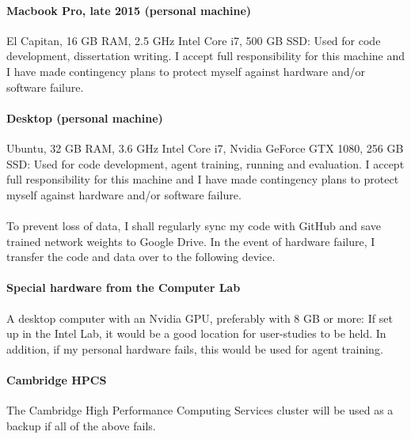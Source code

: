 \documentclass[a4paper]{article}
\begin{document}
\paragraph{Macbook Pro, late 2015 (personal machine)} El Capitan, 16 GB RAM, 2.5 GHz Intel Core i7, 500 GB SSD: Used for code development, dissertation writing. I accept full responsibility for this machine and I have made contingency plans to protect myself against hardware and/or software failure.

\paragraph{Desktop (personal machine)} Ubuntu, 32 GB RAM, 3.6 GHz Intel Core i7, Nvidia GeForce GTX 1080, 256 GB SSD: Used for code development, agent training, running and evaluation. I accept full responsibility for this machine and I have made contingency plans to protect myself against hardware and/or software failure.

\paragraph{}To prevent loss of data, I shall regularly sync my code with GitHub and save trained network weights to Google Drive. In the event of hardware failure, I transfer the code and data over to the following device.

\paragraph{Special hardware from the Computer Lab} A desktop computer with an Nvidia GPU, preferably with 8 GB or more: If set up in the Intel Lab, it would be a good location for user-studies to be held. In addition, if my personal hardware fails, this would be used for agent training.

\paragraph{Cambridge HPCS} The Cambridge High Performance Computing Services cluster will be used as a backup if all of the above fails.


 

\end{document}
